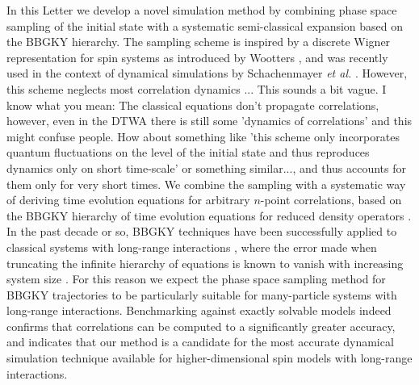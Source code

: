 \documentclass[aps,prl,showpacs,amsmath,amssymb,superscriptaddress,reprint,10pt]{revtex4-1}
\newcommand{\js}[1]{{\color{johannes} #1}}
\newcommand{\mk}[1]{{\color{michael} #1}}
\begin{document}
\begin{bibunit}
In this Letter we develop a novel simulation method by combining phase space sampling of the initial state with a systematic semi-classical expansion based on the BBGKY hierarchy. The sampling scheme is inspired by a discrete Wigner representation for spin systems as introduced by Wootters \cite{Wootters87}, and was recently used in the context of dynamical simulations by Schachenmayer {\em et al.} \cite{Schachenmayer_etal15}. %
{However, this scheme neglects most correlation dynamics}\js{ ... This sounds a bit vague. I know what you mean: The classical equations don’t propagate correlations, however, even in the DTWA there is still some 'dynamics of correlations' and this might confuse people. How about something like 'this scheme only incorporates quantum fluctuations on the level of the initial state and thus reproduces dynamics only on short time-scale' or something similar...}, \mk{and thus accounts for them only for very short times. We combine the sampling with a systematic way of deriving time evolution equations for arbitrary $n$-point correlations, based on the BBGKY hierarchy of time evolution equations for reduced density operators \cite{Bonitz}.} %
In the past decade or so, BBGKY techniques have been successfully applied to classical systems with long-range interactions \cite{BouchetDauxois05,*Nardini_etal12}, where the error made when truncating the infinite hierarchy of equations 
is known to vanish with increasing system size \cite{BraunHepp77}. For this reason we expect the phase space sampling method for BBGKY trajectories to be particularly suitable for many-particle systems with long-range interactions. Benchmarking against exactly solvable models \mk{indeed confirms that correlations can be computed to a significantly greater accuracy, and indicates that our method is a candidate for the most accurate dynamical simulation technique available} for higher-dimensional spin models with long-range interactions.



\end{bibunit}
\end{document}
